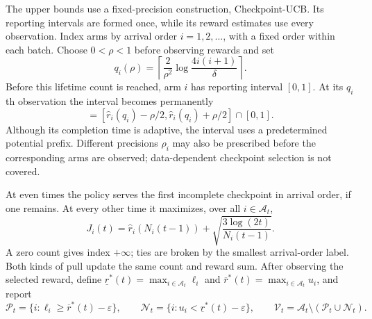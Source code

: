 \documentclass[11pt]{article}
\begin{document}
The upper bounds use a fixed-precision construction, Checkpoint-UCB. Its
reporting intervals are formed once, while its reward estimates use every
observation. Index arms by arrival order $i=1,2,\ldots$, with a fixed order
within each batch. Choose $0<\rho<1$ before observing rewards and set
\begin{equation}
 q_i(\rho)=\left\lceil\frac2{\rho^2}
                  \log\frac{4i(i+1)}\delta\right\rceil.
 \label{eq:checkpoint}
\end{equation}
Before this lifetime count is reached, arm $i$ has reporting interval $[0,1]$.
At its $q_i$th observation the interval becomes permanently
\begin{equation}
 [\ell_i,u_i]=[\hat r_i(q_i)-\rho/2,
                 \hat r_i(q_i)+\rho/2]\cap[0,1].
 \label{eq:fixed_interval}
\end{equation}
Although its completion time is adaptive, the
interval uses a predetermined potential prefix. Different precisions
$\rho_i$ may also be prescribed before the corresponding arms are observed;
data-dependent checkpoint selection is not covered.

At even times the policy serves the first incomplete checkpoint in arrival
order, if one remains. At every other time it maximizes, over all
$i\in\mathcal A_t$,
\begin{equation}
 J_i(t)=\hat r_i(N_i(t-1))+
             \sqrt{\frac{3\log(2t)}{N_i(t-1)}}.
 \label{eq:ucb}
\end{equation}
A zero count gives index $+\infty$; ties are broken by the smallest
arrival-order label. Both kinds of pull update the same count and reward
sum. After observing the selected reward, define
$\underline r^*(t)=\max_{i\in\mathcal A_t}\ell_i$ and
$\overline r^*(t)=\max_{i\in\mathcal A_t}u_i$, and report
\begin{equation}
 \mathcal P_t=\{i:\ell_i\ge\overline r^*(t)-\varepsilon\},\qquad
 \mathcal N_t=\{i:u_i<\underline r^*(t)-\varepsilon\},\qquad
 \mathcal V_t=\mathcal A_t\setminus(\mathcal P_t\cup\mathcal N_t).
 \label{eq:reports}
\end{equation}
\end{document}
